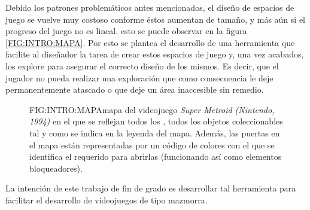 Debido los patrones problemáticos antes mencionados, el diseño de espacios de juego se vuelve muy costoso conforme éstos aumentan de tamaño, y más aún si el progreso del juego no es lineal. esto se puede observar en la figura \ref{FIG:INTRO:MAPA}. Por esto se plantea el desarrollo de una herramienta que facilite al diseñador la tarea de crear estos espacios de juego y, una vez acabados, los explore para asegurar el correcto diseño de los mismos. Es decir, que el jugador no pueda realizar una exploración que como consecuencia le deje permanentemente atascado o que deje un área inaccesible sin remedio.

\begin{figure}{FIG:INTRO:MAPA}{mapa del videojuego \textit{Super Metroid\cite{supermetroid} (Nintendo, 1994)} en el que se reflejan todos los , todos los objetos coleccionables tal y como se indica en la leyenda del mapa. Además, las puertas en el mapa están representadas por un código de colores con el que se identifica el  requerido para abrirlas (funcionando así como elementos bloqueadores).}
\end{figure}

La intención de este trabajo de fin de grado es desarrollar tal herramienta para facilitar el desarrollo de videojuegos de tipo mazmorra.